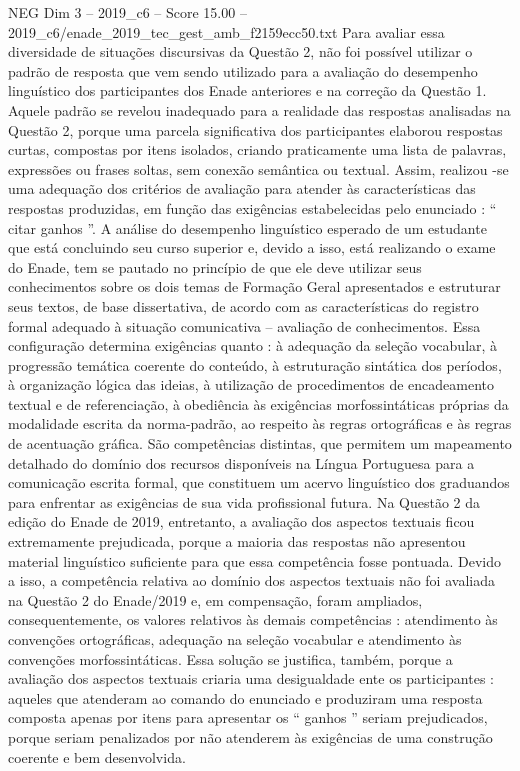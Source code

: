\begin{textsample}{NEG Dim 3 – 2019\_c6 – Score 15.00 – 2019\_c6/enade\_2019\_tec\_gest\_amb\_f2159ecc50.txt}
Para avaliar essa diversidade de situações discursivas da Questão 2, não foi possível utilizar o padrão de resposta que vem sendo utilizado para a avaliação do desempenho linguístico dos participantes dos Enade anteriores e na correção da Questão 1.
Aquele padrão se revelou inadequado para a realidade das respostas analisadas na Questão 2, porque uma parcela significativa dos participantes elaborou respostas curtas, compostas por itens isolados, criando praticamente uma lista de palavras, expressões ou frases soltas, sem conexão semântica ou textual.
Assim, realizou -se uma adequação dos critérios de avaliação para atender às características das respostas produzidas, em função das exigências estabelecidas pelo enunciado : “ citar ganhos ”.
A análise do desempenho linguístico esperado de um estudante que está concluindo seu curso superior e, devido a isso, está realizando o exame do Enade, tem se pautado no princípio de que ele deve utilizar seus conhecimentos sobre os dois temas de Formação Geral apresentados e estruturar seus textos, de base dissertativa, de acordo com as características do registro formal adequado à situação comunicativa – avaliação de conhecimentos.
Essa configuração determina exigências quanto : à adequação da seleção vocabular, à progressão temática coerente do conteúdo, à estruturação sintática dos períodos, à organização lógica das ideias, à utilização de procedimentos de encadeamento textual e de referenciação, à obediência às exigências morfossintáticas próprias da modalidade escrita da norma-padrão, ao respeito às regras ortográficas e às regras de acentuação gráfica.
São competências distintas, que permitem um mapeamento detalhado do domínio dos recursos disponíveis na Língua Portuguesa para a comunicação escrita formal, que constituem um acervo linguístico dos graduandos para enfrentar as exigências de sua vida profissional futura.
Na Questão 2 da edição do Enade de 2019, entretanto, a avaliação dos aspectos textuais ficou extremamente prejudicada, porque a maioria das respostas não apresentou material linguístico suficiente para que essa competência fosse pontuada.
Devido a isso, a competência relativa ao domínio dos aspectos textuais não foi avaliada na Questão 2 do Enade/2019 e, em compensação, foram ampliados, consequentemente, os valores relativos às demais competências : atendimento às convenções ortográficas, adequação na seleção vocabular e atendimento às convenções morfossintáticas.
Essa solução se justifica, também, porque a avaliação dos aspectos textuais criaria uma desigualdade ente os participantes : aqueles que atenderam ao comando do enunciado e produziram uma resposta composta apenas por itens para apresentar os “ ganhos ” seriam prejudicados, porque seriam penalizados por não atenderem às exigências de uma construção coerente e bem desenvolvida.

\end{textsample}
